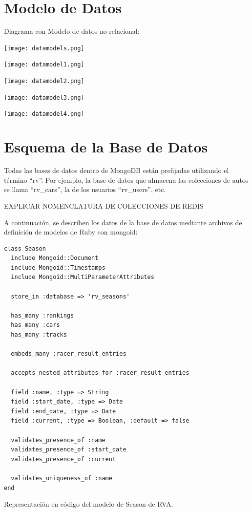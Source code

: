\section{Modelo de Datos}
Diagrama con Modelo de datos no relacional:

\begin{center}
  \texttt{[image: datamodels.png]}
\end{center}

\begin{center}
	\texttt{[image: datamodel1.png]}
\end{center}

\begin{center}
	\texttt{[image: datamodel2.png]}
\end{center}


\begin{center}
	\texttt{[image: datamodel3.png]}
\end{center}

\begin{center}
	\texttt{[image: datamodel4.png]}
\end{center}

\section{Esquema de la Base de Datos}
Todas las bases de datos dentro de MongoDB están prefijadas utilizando el término “rv”. Por ejemplo, la base de datos que almacena las colecciones de autos se llama “rv\_cars”, la de los usuarios “rv\_users”, etc.

EXPLICAR NOMENCLATURA DE COLECCIONES DE REDIS

A continuación, se describen los datos de la base de datos mediante archivos de definición de modelos de Ruby con mongoid:

\begin{listing}
  \begin{verbatim}
class Season
  include Mongoid::Document
  include Mongoid::Timestamps
  include Mongoid::MultiParameterAttributes
  
  store_in :database => 'rv_seasons'
  
  has_many :rankings
  has_many :cars
  has_many :tracks
  
  embeds_many :racer_result_entries
  
  accepts_nested_attributes_for :racer_result_entries
  
  field :name, :type => String
  field :start_date, :type => Date
  field :end_date, :type => Date
  field :current, :type => Boolean, :default => false
  
  validates_presence_of :name
  validates_presence_of :start_date
  validates_presence_of :current
  
  validates_uniqueness_of :name
end
  \end{verbatim}
  \caption[Esquema de Season]{Representación en código del modelo de Season de RVA.}
\end{listing}

